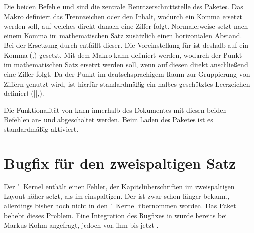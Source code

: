 \begin{DeclareEntity}{}
\begin{Declaration}
  {}
\begin{Declaration}
  {}
\printdeclarationlist
%
Die beiden Befehle  und  sind die zentrale 
Benutzerschnittstelle des Paketes. Das Makro  definiert das 
Trennzeichen oder den Inhalt, wodurch ein Komma ersetzt werden soll, auf 
welches direkt danach eine Ziffer folgt. Normalerweise setzt 
nach einem Komma im mathematischen Satz zusätzlich einen horizontalen Abstand.
Bei der Ersetzung durch  entfällt dieser. Die Voreinstellung
für  ist deshalb auf ein Komma (,) gesetzt. Mit dem Makro 
 kann definiert werden, wodurch der Punkt im mathematischen 
Satz ersetzt werden soll, wenn auf diesen direkt anschließend eine Ziffer 
folgt. Da der Punkt im deutschsprachigem Raum zur Gruppierung von Ziffern 
genutzt wird, ist hierfür standardmäßig ein halbes geschütztes Leerzeichen 
definiert (\Macro||{,}).
\end{Declaration}
\end{Declaration}

\begin{Declaration}
  {}
\begin{Declaration}
  {}
\printdeclarationlist
%
%
Die Funktionalität von  kann innerhalb des Dokumentes mit 
diesen beiden Befehlen an- und abgeschaltet werden. Beim Laden des Paketes ist 
es standardmäßig aktiviert.%
\end{Declaration}
\end{Declaration}
%
%
\end{DeclareEntity}



\section[%
  Das Paket \Package{twocolfix} -- Bugfix für den zweispaltigen Satz%
]{%
  Bugfix für den zweispaltigen Satz%
}
%
\begin{DeclareEntity}{}
Der "~Kernel enthält einen Fehler, der Kapitelüberschriften im
zweispaltigen Layout höher setzt, als im einspaltigen. Der 
ist zwar schon länger bekannt, allerdings bisher noch nicht in den 
"~Kernel übernommen worden. Das Paket  behebt 
dieses Problem. Eine Integration des Bugfixes in \KOMAScript wurde bereits bei 
Markus Kohm angefragt, jedoch von ihm bis jetzt 
.
\end{DeclareEntity}


